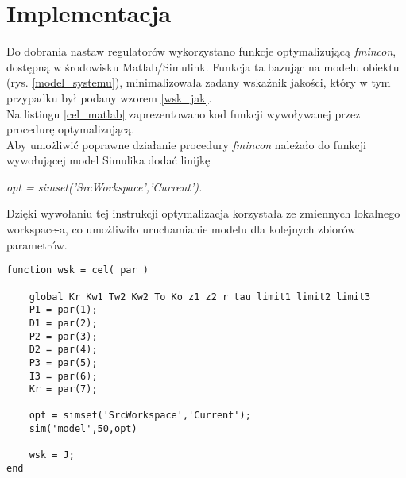 \chapter{Implementacja}
\label{implementacja}
Do dobrania nastaw regulatorów wykorzystano funkcje optymalizującą \textit{fmincon}, dostępną w środowisku Matlab/Simulink. Funkcja ta bazując na modelu obiektu (rys. \ref{model_systemu}), minimalizowała zadany wska\'znik jakości, który w tym przypadku był podany wzorem \ref{wsk_jak}. \\
Na listingu \ref{cel_matlab} zaprezentowano kod funkcji wywoływanej przez procedurę optymalizującą. \\
Aby umożliwić poprawne działanie procedury \textit{fmincon} należało do funkcji wywołującej model Simulika dodać linijkę
\begin{center}
	\textit{opt = simset('SrcWorkspace','Current').}
\end{center}
 Dzięki wywołaniu tej instrukcji optymalizacja korzystała ze zmiennych lokalnego workspace-a, co umożliwiło uruchamianie modelu dla kolejnych zbiorów parametrów.
\begin{lstlisting}[frame=single, caption=Funkcja wywoływana przez procedurę optymalizującą., label = cel_matlab]
function wsk = cel( par )

	global Kr Kw1 Tw2 Kw2 To Ko z1 z2 r tau limit1 limit2 limit3
	P1 = par(1);
	D1 = par(2);
	P2 = par(3);
	D2 = par(4);
	P3 = par(5);
	I3 = par(6);
	Kr = par(7);
	
	opt = simset('SrcWorkspace','Current');
	sim('model',50,opt)
	
	wsk = J;
end
\end{lstlisting}
\newpage


